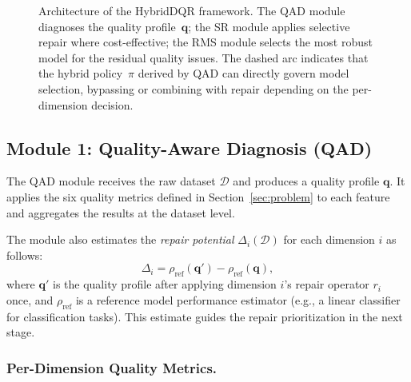 \documentclass[runningheads]{llncs}
\begin{document}
\begin{figure}[t]
\begin{tikzpicture}
\end{tikzpicture}

\caption{Architecture of the HybridDQR framework.
The QAD module diagnoses the quality profile~$\mathbf{q}$;
the SR module applies selective repair where cost-effective;
the RMS module selects the most robust model for the residual
quality issues.
The dashed arc indicates that the hybrid policy~$\pi$ derived by
QAD can directly govern model selection, bypassing or combining
with repair depending on the per-dimension decision.}
\label{fig:framework}
\end{figure}

\subsection{Module 1: Quality-Aware Diagnosis (QAD)}

The QAD module receives the raw dataset $\mathcal{D}$ and
produces a quality profile $\mathbf{q}$.
It applies the six quality metrics defined in
Section~\ref{sec:problem} to each feature and aggregates the
results at the dataset level.

The module also estimates the \emph{repair potential}
$\Delta_i(\mathcal{D})$ for each dimension $i$ as follows:
\begin{equation}
  \Delta_i = \rho_{\text{ref}}\!\left(\mathbf{q}'\right) -
              \rho_{\text{ref}}\!\left(\mathbf{q}\right),
\end{equation}
where $\mathbf{q}'$ is the quality profile after applying dimension
$i$'s repair operator $r_i$ once, and $\rho_{\text{ref}}$ is a
reference model performance estimator (e.g., a linear classifier
for classification tasks).
This estimate guides the repair prioritization in the next stage.

\subsubsection{Per-Dimension Quality Metrics.}
\end{document}
